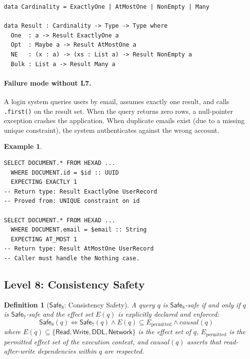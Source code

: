 \documentclass[11pt,a4paper]{article}
\newtheorem{definition}[theorem]{Definition}
\newtheorem{example}[theorem]{Example}
\newcommand{\LevelN}[1]{\textsf{L#1}}
\newcommand{\Safe}[1]{\ensuremath{\mathsf{Safe}_{#1}}}
\begin{document}
\begin{lstlisting}[language=Idris2]
data Cardinality = ExactlyOne | AtMostOne | NonEmpty | Many

data Result : Cardinality -> Type -> Type where
  One  : a -> Result ExactlyOne a
  Opt  : Maybe a -> Result AtMostOne a
  NE   : (x : a) -> (xs : List a) -> Result NonEmpty a
  Bulk : List a -> Result Many a
\end{lstlisting}

\paragraph{Failure mode without \LevelN{7}.}
A login system queries users by email, assumes exactly one result, and
calls \texttt{.first()} on the result set.  When the query returns zero
rows, a null-pointer exception crashes the application.  When duplicate
emails exist (due to a missing unique constraint), the system
authenticates against the wrong account.

\begin{example}
\begin{lstlisting}[language=VQL]
SELECT DOCUMENT.* FROM HEXAD ...
  WHERE DOCUMENT.id = $id :: UUID
  EXPECTING EXACTLY 1
-- Return type: Result ExactlyOne UserRecord
-- Proved from: UNIQUE constraint on id

SELECT DOCUMENT.* FROM HEXAD ...
  WHERE DOCUMENT.email = $email :: String
  EXPECTING AT_MOST 1
-- Return type: Result AtMostOne UserRecord
-- Caller must handle the Nothing case.
\end{lstlisting}
\end{example}

\subsection{Level 8: Consistency Safety}\label{sec:L8}

\begin{definition}[\Safe{8}: Consistency Safety]
A query $q$ is \Safe{8}-safe if and only if $q$ is \Safe{7}-safe and
the effect set $E(q)$ is explicitly declared and enforced:
\[
  \Safe{8}(q) \iff \Safe{7}(q) \land
  E(q) \subseteq E_{\text{permitted}} \land
  \mathit{causal}(q)
\]
where $E(q) \subseteq \{\mathsf{Read}, \mathsf{Write}, \mathsf{DDL},
\mathsf{Network}\}$ is the effect set of $q$,
$E_{\text{permitted}}$ is the permitted effect set of the execution
context, and $\mathit{causal}(q)$ asserts that read-after-write
dependencies within $q$ are respected.
\end{definition}
\end{document}

